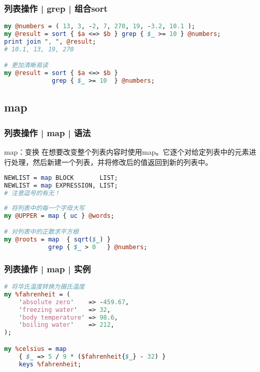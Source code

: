 \begin{frame}[fragile]
  \frametitle{列表操作 | grep | 组合sort}
\begin{lstlisting}[language=Perl]
my @numbers = ( 13, 3, -2, 7, 270, 19, -3.2, 10.1 );
my @result = sort { $a <=> $b } grep { $_ >= 10 } @numbers;
print join ", ", @result;
# 10.1, 13, 19, 270

# 更加清晰易读
my @result = sort { $a <=> $b }
             grep { $_ >= 10  } @numbers;
\end{lstlisting}
\end{frame}

\subsection{map}
\begin{frame}[fragile]
  \frametitle{列表操作 | map | \alert{语法}}
  \begin{block}{map：变换}
在想要改变整个列表内容时使用map。它逐个对给定列表中的元素进行处理，然后新建一个列表，并将修改后的值返回到新的列表中。 
  \end{block}
  \vspace{-1.5em}
\begin{lstlisting}[language=Perl]
NEWLIST = map BLOCK       LIST;
NEWLIST = map EXPRESSION, LIST;
# 注意逗号的有无！
\end{lstlisting}
\pause
\begin{lstlisting}[language=Perl]
# 将列表中的每一个字母大写
my @UPPER = map { uc } @words;

# 对列表中的正数求平方根
my @roots = map  { sqrt($_) }
            grep { $_ > 0   } @numbers;
\end{lstlisting}
\end{frame}

\begin{frame}[fragile]
  \frametitle{列表操作 | map | 实例}
  \vspace{-1.5em}
\begin{lstlisting}[language=Perl]
# 将华氏温度转换为摄氏温度
my %fahrenheit = (
    'absolute zero'    => -459.67,
    'freezing water'   => 32,
    'body temperature' => 98.6,
    'boiling water'    => 212,
);

my %celsius = map 
    { $_ => 5 / 9 * ($fahrenheit{$_} - 32) }
    keys %fahrenheit;
\end{lstlisting}
\end{frame}

